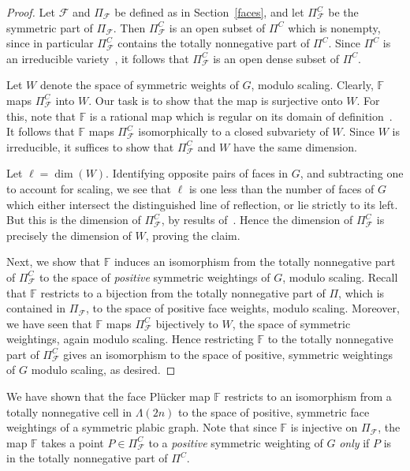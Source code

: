 \documentclass[10pt]{amsart}
\theoremstyle{definition}
\newcommand{\Lm}{\Lambda}
\begin{document}
\begin{proof}
Let $\mathcal{F}$ and $\Pi_{\mathcal{F}}$ be defined as in Section~\ref{faces}, and let $\Pi_{\mathcal{F}}^C$ be the symmetric part of $\Pi_{\mathcal{F}}$. Then $\Pi^C_{\mathcal{F}}$ is an open subset of $\Pi^C$ which is nonempty, since in particular $\Pi^C_{\mathcal{F}}$ contains the totally nonnegative part of $\Pi^C$. Since $\Pi^C$ is an irreducible variety~\cite{Kar18}, it follows that $\Pi^C_{\mathcal{F}}$ is an open dense subset of $\Pi^C$.

Let $W$ denote the space of symmetric weights of $G$, modulo scaling. Clearly, $\mathbb{F}$ maps $\Pi_{\mathcal{F}}^C$ into $W$. Our task is to show that the map is surjective onto $W$. For this, note that $\mathbb{F}$ is a rational map which is regular on its domain of definition~\cite{MS17}. It follows that $\mathbb{F}$ maps $\Pi_{\mathcal{F}}^C$ isomorphically to a closed subvariety of $W$. Since $W$ is irreducible, it suffices to show that $\Pi_{\mathcal{F}}^C$ and $W$ have the same dimension.

Let $\ell=\dim(W)$. Identifying opposite pairs of faces in $G$, and subtracting one to account for scaling, we see that $\ell$ is one less than the number of faces of $G$ which either intersect the distinguished line of reflection, or lie strictly to its left. But this is the dimension of $\Pi_{\mathcal{F}}^C$, by results of~\cite[Section 5]{Kar18}. Hence the dimension of $\Pi_{\mathcal{F}}^C$ is precisely the dimension of $W$, proving the claim.

Next, we show that $\mathbb{F}$ induces an isomorphism from the totally nonnegative part of $\Pi_{\mathcal{F}}^C$ to the space of \emph{positive} symmetric weightings of $G$, modulo scaling. Recall that $\mathbb{F}$ restricts to a bijection from the totally nonnegative part of $\Pi$, which is contained in $\Pi_{\mathcal{F}}$, to the space of positive face weights, modulo scaling. Moreover, we have seen that $\mathbb{F}$ maps $\Pi_{\mathcal{F}}^C$ bijectively to $W$, the space of symmetric weightings, again modulo scaling. Hence restricting $\mathbb{F}$ to the totally nonnegative part of $\Pi_{\mathcal{F}}^C$ gives an isomorphism to the space of positive, symmetric weightings of $G$ modulo scaling, as desired. \end{proof}

We have shown that the face Pl{\"u}cker map $\mathbb{F}$ restricts to an isomorphism from a totally nonnegative cell in $\Lm(2n)$ to the space of positive, symmetric face weightings of a symmetric plabic graph. 
Note that since $\mathbb{F}$ is injective on $\Pi_{\mathcal{F}}$, the map $\mathbb{F}$ takes a point $P \in\Pi_{\mathcal{F}}^C$ to a \emph{positive} symmetric weighting of $G$ \emph{only} if $P$ is in the totally nonnegative part of $\Pi^C$.
\end{document}
